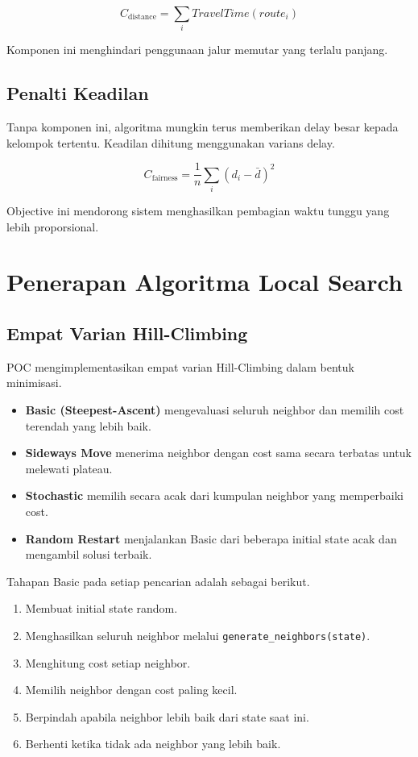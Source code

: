 \documentclass[11pt,a4paper]{article}
\begin{document}
\[
C_{\mathrm{distance}} = \sum_i TravelTime(route_i)
\]

Komponen ini menghindari penggunaan jalur memutar yang terlalu panjang.

\subsection{Penalti Keadilan}

Tanpa komponen ini, algoritma mungkin terus memberikan delay besar kepada kelompok tertentu. Keadilan dihitung menggunakan varians delay.

\[
C_{\mathrm{fairness}} = \frac{1}{n} \sum_i \left(d_i - \bar{d}\right)^2
\]

Objective ini mendorong sistem menghasilkan pembagian waktu tunggu yang lebih proporsional.

\section{Penerapan Algoritma Local Search}

\subsection{Empat Varian Hill-Climbing}

POC mengimplementasikan empat varian Hill-Climbing dalam bentuk minimisasi.

\begin{itemize}[leftmargin=2em,itemsep=0.1em]
  \item \textbf{Basic (Steepest-Ascent)} mengevaluasi seluruh neighbor dan memilih cost terendah yang lebih baik.
  \item \textbf{Sideways Move} menerima neighbor dengan cost sama secara terbatas untuk melewati plateau.
  \item \textbf{Stochastic} memilih secara acak dari kumpulan neighbor yang memperbaiki cost.
  \item \textbf{Random Restart} menjalankan Basic dari beberapa initial state acak dan mengambil solusi terbaik.
\end{itemize}

Tahapan Basic pada setiap pencarian adalah sebagai berikut.

\begin{enumerate}[leftmargin=2em,itemsep=0.1em]
  \item Membuat initial state random.
  \item Menghasilkan seluruh neighbor melalui \texttt{generate\_neighbors(state)}.
  \item Menghitung cost setiap neighbor.
  \item Memilih neighbor dengan cost paling kecil.
  \item Berpindah apabila neighbor lebih baik dari state saat ini.
  \item Berhenti ketika tidak ada neighbor yang lebih baik.
\end{enumerate}
\end{document}
